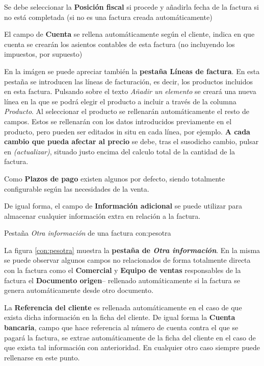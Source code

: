 Se debe seleccionar la \textbf{Posición fiscal} si procede y añadirla fecha de la factura si no está completada (si no es una factura creada
automáticamente)

El campo de \textbf{Cuenta} se rellena automáticamente según el cliente, indica en que cuenta se crearán los asientos contables de esta factura  (no incluyendo los impuestos, por supuesto)

En la imágen se puede apreciar también la \textbf{pestaña Líneas de factura}. En esta pestaña se introducen las líneas de facturación, es decir, los productos incluidos en esta factura. Pulsando sobre el texto \emph{Añadir un elemento} se creará una nueva línea en la que se podrá elegir el producto a incluir a través de la columna \emph{Producto}. Al seleccionar el producto se rellenarán automáticamente el resto de campos. Estos se rellenarán con los datos introducidos previamente en el producto, pero pueden ser editados in situ en cada línea, por ejemplo. \textbf{A cada cambio que pueda afectar al precio} se debe, tras el susodicho cambio, pulsar en \emph{(actualizar)}, situado justo encima del calculo total de la cantidad de la factura.

Como \textbf{Plazos de pago} existen algunos por defecto, siendo totalmente configurable según las necesidades de la venta.

De igual forma, el campo de \textbf{Información adicional} se puede utilizar para almacenar cualquier información extra en relación a la factura.


{Pestaña \emph{Otra información} de una factura}
{con:pesotra}

La figura \ref{con:pesotra} muestra la \textbf{pestaña de \emph{Otra información}}. En la misma se puede observar algunos campos no relacionados de forma totalmente directa con la factura como el \textbf{Comercial} y \textbf{Equipo de ventas} responsables de la factura   el \textbf{Documento origen}-- rellenado automáticamente si la factura se genera automáticamente desde otro documento.

La \textbf{Referencia del cliente} es rellenada automáticamente en el caso de que exista dicha información en la ficha del cliente. De igual forma la \textbf{Cuenta bancaria}, campo que hace referencia al número de cuenta contra el que se pagará la factura, se extrae automáticamente de la ficha del cliente en el caso de que exista tal información con anterioridad. En cualquier otro caso siempre puede rellenarse en este punto.

